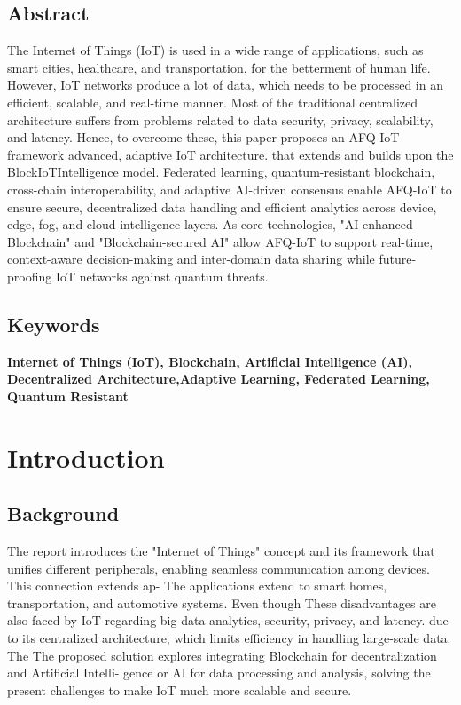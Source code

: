 \documentclass[12pt, oneside]{report}
\begin{document}
\section*{Abstract}
The Internet of Things (IoT) is used in a wide range of applications, such as smart cities, healthcare, and transportation, for the betterment of human life. However, IoT networks produce a lot of data, which needs to be processed in an efficient, scalable, and real-time manner. Most of the traditional centralized architecture suffers from problems related to data security, privacy, scalability, and latency. Hence, to overcome these, this paper proposes an AFQ-IoT framework advanced, adaptive IoT architecture.
that extends and builds upon the BlockIoTIntelligence model. Federated learning, quantum-resistant blockchain, cross-chain interoperability, and adaptive AI-driven consensus enable AFQ-IoT to ensure secure, decentralized data handling and efficient analytics across device, edge, fog, and cloud intelligence layers. As core technologies, "AI-enhanced Blockchain" and "Blockchain-secured AI" allow AFQ-IoT to support real-time, context-aware decision-making and inter-domain data sharing while future-proofing IoT networks against quantum threats. 

\section*{Keywords}
\noindent \textbf{Internet of Things (IoT), Blockchain, Artificial Intelligence (AI), Decentralized Architecture,Adaptive Learning, Federated Learning, Quantum Resistant}
   



\tableofcontents
\newpage

\listoffigures
{}
\newpage

\listoftables
{}
\newpage

\chapter{Introduction}

\section{Background}
The report introduces the "Internet of Things" concept and its framework that unifies different
peripherals, enabling seamless communication among devices. This connection extends ap-
The applications extend to smart homes, transportation, and automotive systems. Even though
These disadvantages are also faced by IoT regarding big data analytics, security, privacy, and latency.
due to its centralized architecture, which limits efficiency in handling large-scale data. The
The proposed solution explores integrating Blockchain for decentralization and Artificial Intelli-
gence or AI for data processing and analysis, solving the present challenges to make IoT much more
scalable and secure.
\end{document}
